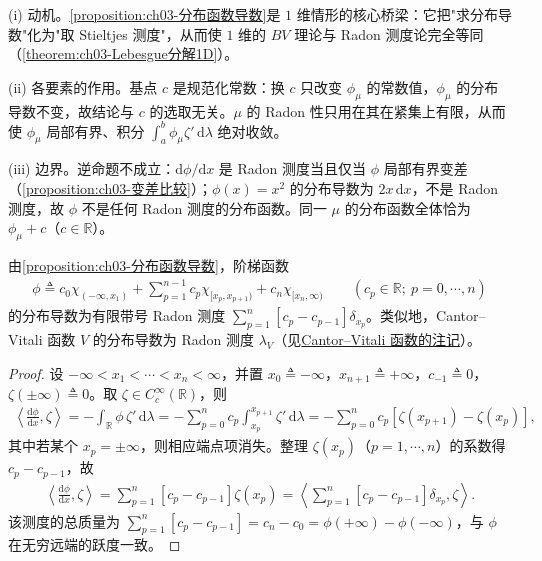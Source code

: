 \documentclass[../../main.tex]{subfiles}%
\begin{document}
\begin{remark}\label{remark:ch03-分布函数导数动机}
(i) 动机。\cref{proposition:ch03-分布函数导数}是 $1$ 维情形的核心桥梁：它把"求分布导数"化为"取 Stieltjes 测度"，从而使 $1$ 维的 $BV$ 理论与 Radon 测度论完全等同（\cref{theorem:ch03-Lebesgue分解1D}）。

(ii) 各要素的作用。基点 $c$ 是规范化常数：换 $c$ 只改变 $\phi_\mu$ 的常数值，$\phi_\mu$ 的分布导数不变，故结论与 $c$ 的选取无关。$\mu$ 的 Radon 性只用在其在紧集上有限，从而使 $\phi_\mu$ 局部有界、积分 $\int_a^b\phi_\mu\zeta'\,\mathrm{d}\lambda$ 绝对收敛。

(iii) 边界。逆命题不成立：$\mathrm{d}\phi/\mathrm{d}x$ 是 Radon 测度当且仅当 $\phi$ 局部有界变差（\cref{proposition:ch03-变差比较}）；$\phi(x)=x^2$ 的分布导数为 $2x\,\mathrm{d}x$，不是 Radon 测度，故 $\phi$ 不是任何 Radon 测度的分布函数。同一 $\mu$ 的分布函数全体恰为 $\phi_\mu+c$（$c\in\mathbb{R}$）。
\end{remark}

\begin{remark}\label{remark:ch03-阶梯函数导数}
由\cref{proposition:ch03-分布函数导数}，阶梯函数
\begin{align*}
\phi\triangleq c_0\chi_{(-\infty,x_1)}+\sum_{p=1}^{n-1}c_p\chi_{[x_p,x_{p+1})}+c_n\chi_{[x_n,\infty)}
\qquad(c_p\in\mathbb{R};\ p=0,\cdots ,n)
\end{align*}
的分布导数为有限带号 Radon 测度 $\sum_{p=1}^n[c_p-c_{p-1}]\delta_{x_p}$。类似地，Cantor--Vitali 函数 $V$ 的分布导数为 Radon 测度 $\lambda_V$（见\hyperref[remark:ch01-Cantor-Vitali]{Cantor--Vitali 函数的注记}）。
\end{remark}

\begin{proof}
设 $-\infty<x_1<\cdots <x_n<\infty$，并置 $x_0\triangleq-\infty$，$x_{n+1}\triangleq+\infty$，$c_{-1}\triangleq0$，$\zeta(\pm\infty)\triangleq0$。取 $\zeta\in C^\infty_c(\mathbb{R})$，则
\begin{align*}
\left\langle\frac{\mathrm{d}\phi}{\mathrm{d}x},\zeta\right\rangle
=-\int_{\mathbb{R}}\phi\,\zeta'\,\mathrm{d}\lambda
=-\sum_{p=0}^{n}c_p\int_{x_p}^{x_{p+1}}\zeta'\,\mathrm{d}\lambda
=-\sum_{p=0}^{n}c_p[\zeta(x_{p+1})-\zeta(x_p)],
\end{align*}
其中若某个 $x_p=\pm\infty$，则相应端点项消失。整理 $\zeta(x_p)$（$p=1,\cdots ,n$）的系数得 $c_p-c_{p-1}$，故
\begin{align*}
\left\langle\frac{\mathrm{d}\phi}{\mathrm{d}x},\zeta\right\rangle=\sum_{p=1}^{n}[c_p-c_{p-1}]\zeta(x_p)=\left\langle\sum_{p=1}^{n}[c_p-c_{p-1}]\delta_{x_p},\zeta\right\rangle.
\end{align*}
该测度的总质量为 $\sum_{p=1}^{n}[c_p-c_{p-1}]=c_n-c_0=\phi(+\infty)-\phi(-\infty)$，与 $\phi$ 在无穷远端的跃度一致。
\end{proof}
\end{document}
